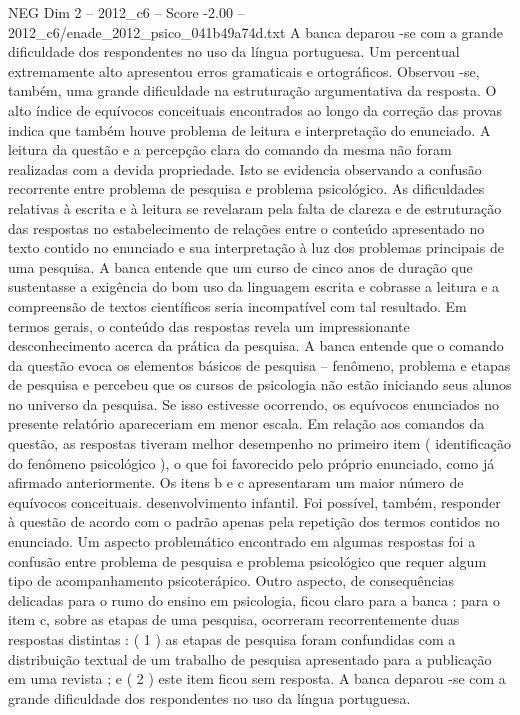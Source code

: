 \begin{textsample}{NEG Dim 2 – 2012\_c6 – Score -2.00 – 2012\_c6/enade\_2012\_psico\_041b49a74d.txt}
A banca deparou -se com a grande dificuldade dos respondentes no uso da língua portuguesa.
Um percentual extremamente alto apresentou erros gramaticais e ortográficos.
Observou -se, também, uma grande dificuldade na estruturação argumentativa da resposta.
O alto índice de equívocos conceituais encontrados ao longo da correção das provas indica que também houve problema de leitura e interpretação do enunciado.
A leitura da questão e a percepção clara do comando da mesma não foram realizadas com a devida propriedade.
Isto se evidencia observando a confusão recorrente entre problema de pesquisa e problema psicológico.
As dificuldades relativas à escrita e à leitura se revelaram pela falta de clareza e de estruturação das respostas no estabelecimento de relações entre o conteúdo apresentado no texto contido no enunciado e sua interpretação à luz dos problemas principais de uma pesquisa.
A banca entende que um curso de cinco anos de duração que sustentasse a exigência do bom uso da linguagem escrita e cobrasse a leitura e a compreensão de textos científicos seria incompatível com tal resultado.
Em termos gerais, o conteúdo das respostas revela um impressionante desconhecimento acerca da prática da pesquisa.
A banca entende que o comando da questão evoca os elementos básicos de pesquisa – fenômeno, problema e etapas de pesquisa e percebeu que os cursos de psicologia não estão iniciando seus alunos no universo da pesquisa.
Se isso estivesse ocorrendo, os equívocos enunciados no presente relatório apareceriam em menor escala.
Em relação aos comandos da questão, as respostas tiveram melhor desempenho no primeiro item ( identificação do fenômeno psicológico ), o que foi favorecido pelo próprio enunciado, como já afirmado anteriormente.
Os itens b e c apresentaram um maior número de equívocos conceituais. desenvolvimento infantil.
Foi possível, também, responder à questão de acordo com o padrão apenas pela repetição dos termos contidos no enunciado.
Um aspecto problemático encontrado em algumas respostas foi a confusão entre problema de pesquisa e problema psicológico que requer algum tipo de acompanhamento psicoterápico.
Outro aspecto, de consequências delicadas para o rumo do ensino em psicologia, ficou claro para a banca : para o item c, sobre as etapas de uma pesquisa, ocorreram recorrentemente duas respostas distintas : ( 1 ) as etapas de pesquisa foram confundidas com a distribuição textual de um trabalho de pesquisa apresentado para a publicação em uma revista ; e ( 2 ) este item ficou sem resposta.
A banca deparou -se com a grande dificuldade dos respondentes no uso da língua portuguesa.

\end{textsample}
